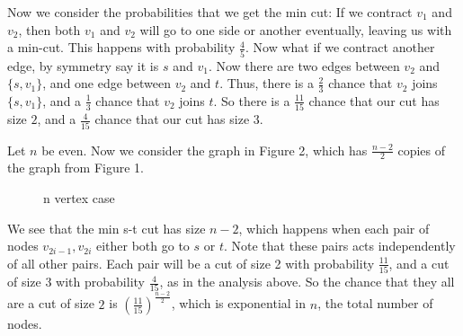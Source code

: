 \documentclass{article}
\begin{document}
    \vspace{3mm}
    Now we consider the probabilities that we get the min cut: If we contract $v_1$ and $v_2$, then both $v_1$ and $v_2$ will go to one side or another eventually, leaving us with a min-cut. This happens with probability $\frac45$. Now what if we contract another edge, by symmetry say it is $s$ and $v_1$. Now there are two edges between $v_2$ and $\{s,v_1\}$, and one edge between $v_2$ and $t$. Thus, there is a $\frac23$ chance that $v_2$ joins $\{s,v_1\}$, and a $\frac13$ chance that $v_2$ joins $t$. So there is a $\frac{11}{15}$ chance that our cut has size $2$, and a
    $\frac4{15}$ chance that our cut has size $3$. 
    
    \vspace{3mm}
    Let $n$ be even. Now we consider the graph in Figure 2, which has $\frac{n-2}{2}$ copies of the graph from Figure 1.
    \begin{figure}[htbp]
      \begin{center}
      \end{center}
      \vspace{-6mm}
      \caption{n vertex case}
    \end{figure}
    We see that the min s-t cut has size $n-2$, which happens when each pair of nodes $v_{2i-1}, v_{2i}$ either both go to $s$ or $t$. Note that these pairs acts independently of all other pairs. Each pair will be a cut of size 2 with probability $\frac{11}{15}$, and a cut of size 3 with probability $\frac4{15}$, as in the analysis above. So the chance that they all are a cut of size $2$ is $(\frac{11}{15})^{\frac{n-2}{2}}$, which is exponential in $n$, the total number of nodes.
\end{document}
